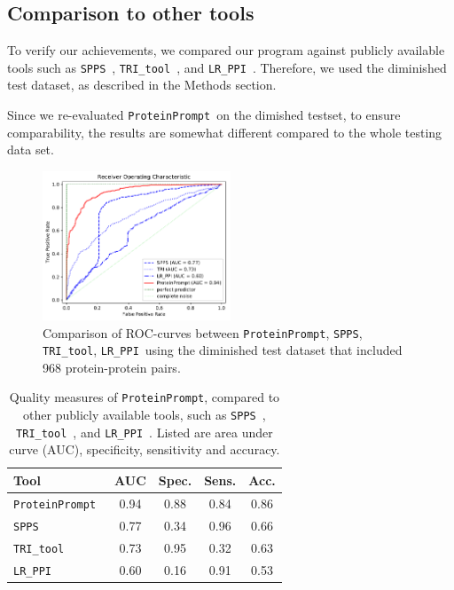 \documentclass[3p,times,twocolumn]{elsarticle}
\newcommand{\spps}{\texttt{SPPS}}
\newcommand{\tri}{\texttt{TRI\_tool}}
\newcommand{\lr}{\texttt{LR\_PPI}}
\newcommand{\tool}{\texttt{ProteinPrompt}}
\begin{document}
\subsection{Comparison to other tools}

To verify our achievements, we compared our program against publicly
available tools such as \spps\ \cite{Liu:2012}, \tri\
\cite{Perovic:2017}, and \lr\ \cite{Pan:2010}. Therefore, we used the
diminished test dataset, as described in the Methods section. 

Since we re-evaluated \tool\  on the dimished testset, to ensure
comparability, the results are somewhat different compared to the
whole testing data set. 

\begin{figure}
  \includegraphics[width=0.5\textwidth]{img/comparison_roc.pdf}
  \caption{Comparison of ROC-curves between \tool, \spps, \tri, \lr\ 
    using the diminished test dataset that included 968
    protein-protein pairs.}
  \label{fig:comparison}
\end{figure}


\begin{table}
\begin{tabular}{|l |c | c | c | c |}
  \hline
  Tool  & AUC & Spec. & Sens. & Acc. \\
  \hline
  \tool\   & 0.94 & 0.88 & 0.84 &  0.86 \\
  \hline
  \spps\  & 0.77 & 0.34 & 0.96 & 0.66 \\
  \hline
  \tri\  & 0.73 & 0.95 & 0.32 & 0.63 \\
  \hline
  \lr\  & 0.60 & 0.16 & 0.91 & 0.53  \\
  \hline
\end{tabular}
\caption{ Quality measures of \tool, compared to other publicly
  available tools, such as \spps\ \cite{Liu:2012}, \tri\
  \cite{Perovic:2017}, and \lr\ \cite{Pan:2010}.
  Listed are area under curve (AUC), specificity, sensitivity and accuracy.}

\label{table:comparison}
\end{table}
\end{document}
